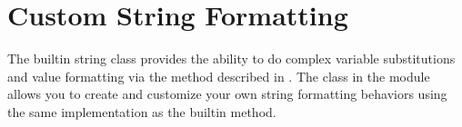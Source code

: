 \documentclass[letterpaper,10pt,english]{sphinxmanual}
\begin{document}
\section{Custom String Formatting}
\label{\detokenize{string:custom-string-formatting}}\label{\detokenize{string:string-formatting}}
The built\sphinxhyphen{}in string class provides the ability to do complex variable
substitutions and value formatting via the  method described in
.  The {\hyperref[\detokenize{string:string.Formatter}]{}} class in the {\hyperref[\detokenize{string:module-string}]{}} module allows
you to create and customize your own string formatting behaviors using the same
implementation as the built\sphinxhyphen{}in  method.
\end{document}
